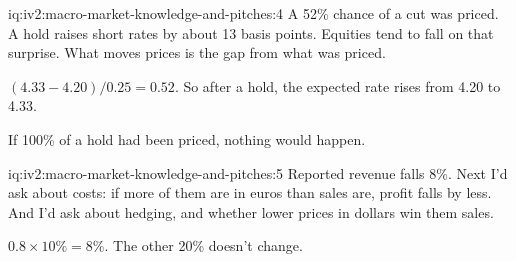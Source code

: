\begin{solution}{iq:iv2:macro-market-knowledge-and-pitches:4}
A 52\% chance of a cut was priced. A hold raises short rates by about 13 basis points. Equities tend to fall on that surprise. What moves prices is the gap from what was priced.

$(4.33 - 4.20)/0.25 = 0.52$. So after a hold, the expected rate rises from 4.20 to 4.33.

If 100\% of a hold had been priced, nothing would happen.

\end{solution}

\begin{solution}{iq:iv2:macro-market-knowledge-and-pitches:5}
Reported revenue falls 8\%. Next I'd ask about costs: if more of them are in euros than sales are, profit falls by less. And I'd ask about hedging, and whether lower prices in dollars win them sales.

$0.8 \times 10\% = 8\%$. The other 20\% doesn't change.

\end{solution}

